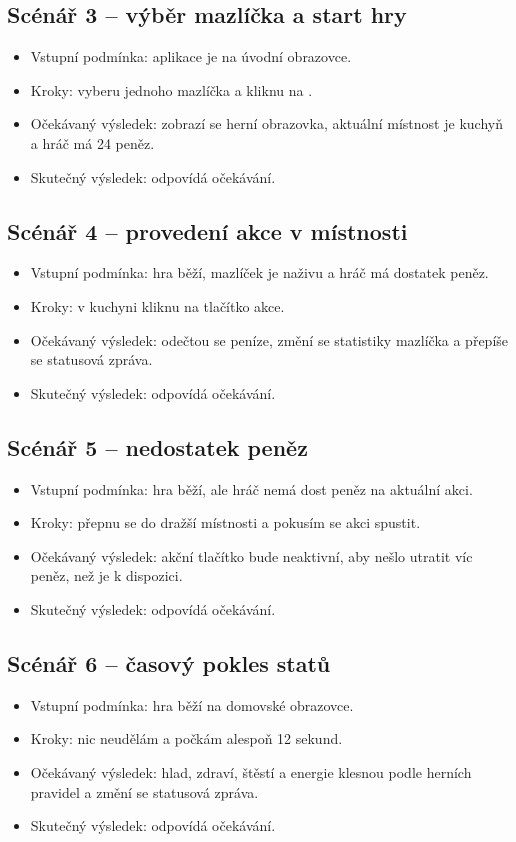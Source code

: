 \documentclass[12pt,a4paper]{article}
\begin{document}
\subsection*{Scénář 3 -- výběr mazlíčka a start hry}
\begin{itemize}[leftmargin=2em]
  \item Vstupní podmínka: aplikace je na úvodní obrazovce.
  \item Kroky: vyberu jednoho mazlíčka a kliknu na .
  \item Očekávaný výsledek: zobrazí se herní obrazovka, aktuální místnost je kuchyň a hráč má 24 peněz.
  \item Skutečný výsledek: odpovídá očekávání.
\end{itemize}

\subsection*{Scénář 4 -- provedení akce v místnosti}
\begin{itemize}[leftmargin=2em]
  \item Vstupní podmínka: hra běží, mazlíček je naživu a hráč má dostatek peněz.
  \item Kroky: v kuchyni kliknu na tlačítko akce.
  \item Očekávaný výsledek: odečtou se peníze, změní se statistiky mazlíčka a přepíše se statusová zpráva.
  \item Skutečný výsledek: odpovídá očekávání.
\end{itemize}

\subsection*{Scénář 5 -- nedostatek peněz}
\begin{itemize}[leftmargin=2em]
  \item Vstupní podmínka: hra běží, ale hráč nemá dost peněz na aktuální akci.
  \item Kroky: přepnu se do dražší místnosti a pokusím se akci spustit.
  \item Očekávaný výsledek: akční tlačítko bude neaktivní, aby nešlo utratit víc peněz, než je k dispozici.
  \item Skutečný výsledek: odpovídá očekávání.
\end{itemize}

\subsection*{Scénář 6 -- časový pokles statů}
\begin{itemize}[leftmargin=2em]
  \item Vstupní podmínka: hra běží na domovské obrazovce.
  \item Kroky: nic neudělám a počkám alespoň 12 sekund.
  \item Očekávaný výsledek: hlad, zdraví, štěstí a energie klesnou podle herních pravidel a změní se statusová zpráva.
  \item Skutečný výsledek: odpovídá očekávání.
\end{itemize}
\end{document}
